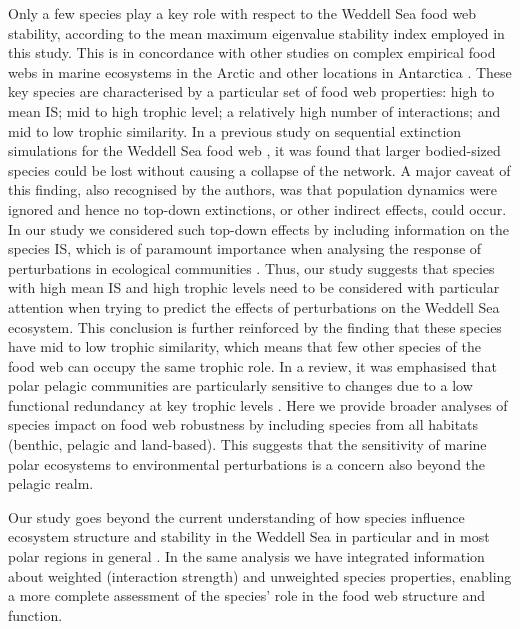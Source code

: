 \documentclass[gc, manuscript]{copernicus}
\begin{document}
Only a few species play a key role with respect to the Weddell Sea food
web stability, according to the mean maximum eigenvalue stability index
employed in this study. This is in concordance with other studies on
complex empirical food webs in marine ecosystems in the Arctic and other
locations in Antarctica \citep{Kortsch2015, Marina2018, Rodriguez2022}.
These key species are characterised by a particular set of food web
properties: high to mean IS; mid to high trophic level; a relatively
high number of interactions; and mid to low trophic similarity. In a
previous study on sequential extinction simulations for the Weddell Sea
food web \citep[!!]{CITA}, it was found that larger bodied-sized species
could be lost without causing a collapse of the network. A major caveat
of this finding, also recognised by the authors, was that population
dynamics were ignored and hence no top-down extinctions, or other
indirect effects, could occur. In our study we considered such top-down
effects by including information on the species IS, which is of
paramount importance when analysing the response of perturbations in
ecological communities \citep{McCann1998, Montoya2009, Novak2011}. Thus,
our study suggests that species with high mean IS and high trophic
levels need to be considered with particular attention when trying to
predict the effects of perturbations on the Weddell Sea ecosystem. This
conclusion is further reinforced by the finding that these species have
mid to low trophic similarity, which means that few other species of the
food web can occupy the same trophic role. In a review, it was
emphasised that polar pelagic communities are particularly sensitive to
changes due to a low functional redundancy at key trophic levels
\citep{Murphy2016}. Here we provide broader analyses of species impact
on food web robustness by including species from all habitats (benthic,
pelagic and land-based). This suggests that the sensitivity of marine
polar ecosystems to environmental perturbations is a concern also beyond
the pelagic realm.

\clearpage
\conclusions[Conclusions]

Our study goes beyond the current understanding of how species influence
ecosystem structure and stability in the Weddell Sea in particular and
in most polar regions in general \citep{Murphy2016, McCormack2021}. In
the same analysis we have integrated information about weighted
(interaction strength) and unweighted species properties, enabling a
more complete assessment of the species' role in the food web structure
and function.
\end{document}

